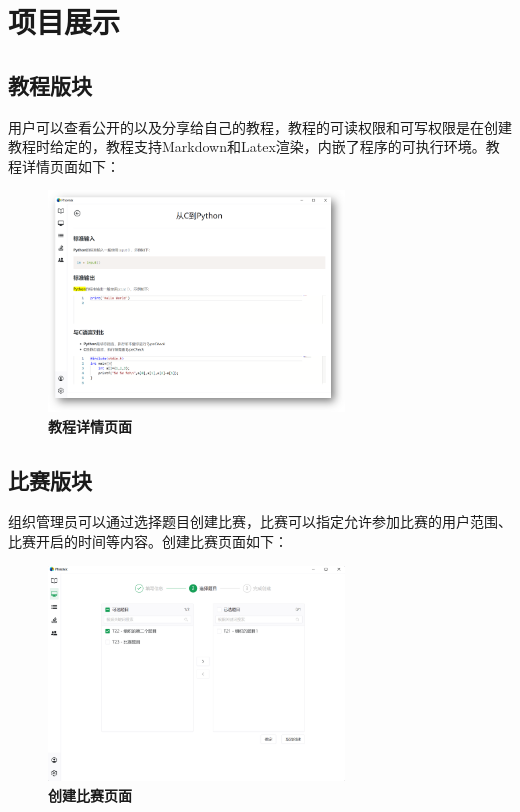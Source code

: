 \chapter{项目展示}

\section{教程版块}

用户可以查看公开的以及分享给自己的教程，教程的可读权限和可写权限是在创建教程时给定的，教程支持Markdown和Latex渲染，内嵌了程序的可执行环境。教程详情页面如下：

\begin{figure}[H]
    \centering
    \includegraphics[width=0.7\textwidth]{figure/tutorial1.png}
    \caption{\textbf{教程详情页面}}
    \label{fig:tutorial1}
\end{figure}

\section{比赛版块}

组织管理员可以通过选择题目创建比赛，比赛可以指定允许参加比赛的用户范围、比赛开启的时间等内容。创建比赛页面如下：

\begin{figure}[H]
    \centering
    \includegraphics[width=0.7\textwidth]{figure/contest1.png}
    \caption{\textbf{创建比赛页面}}
    \label{fig:contest1}
\end{figure}

